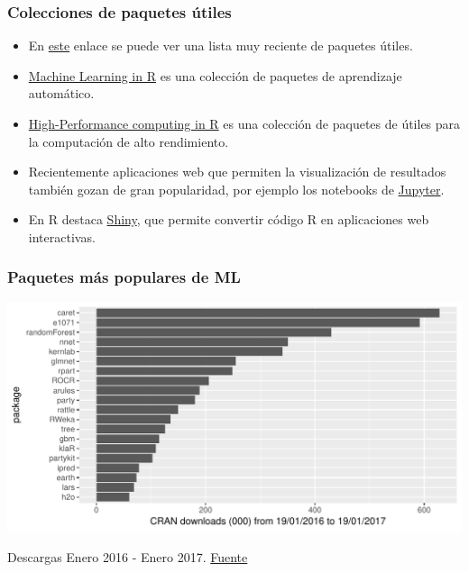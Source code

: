 \documentclass{beamer}
\begin{document}
\begin{frame}
\frametitle{Colecciones de paquetes útiles}
\begin{itemize}
\item En \href{https://support.rstudio.com/hc/en-us/articles/201057987-Quick-list-of-useful-R-packages}{este} enlace se puede ver una lista muy reciente de paquetes útiles.
\item \href{https://cran.r-project.org/web/views/MachineLearning.html}{Machine Learning in R} es una colección de paquetes de aprendizaje automático.
\item \href{http://cran.r-project.org/web/views/HighPerformanceComputing.html}{High-Performance computing in R} es una colección de paquetes de útiles para la computación de alto rendimiento.
\item Recientemente aplicaciones web que permiten la visualización de resultados también gozan de gran popularidad, por ejemplo los notebooks de \href{http://jupyter.org/}{Jupyter}.
\item En R destaca \href{http://shiny.rstudio.com/}{Shiny}, que permite convertir código R en aplicaciones web interactivas.
\end{itemize}
\end{frame}

\begin{frame}
\frametitle{Paquetes más populares de ML}
\centering
\includegraphics[width=\textwidth]{top20.pdf}

{\footnotesize Descargas Enero 2016 - Enero 2017. \href{https://github.com/thedataincubator/data-science-blogs}{Fuente}}
\end{frame}
\end{document}
